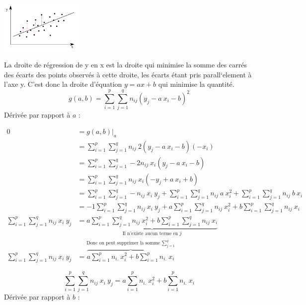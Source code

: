 \begin{center}
	\includegraphics[width=0.3\textwidth]{images/droite_de_regression.pdf}
\end{center}
La droite de régression de y en x est la droite qui minimise la somme des carrés des écarts des points observés à cette droite, les écarts étant pris parall`element à l'axe y. C'est donc la droite d'équation $y = ax+b$ qui minimise la quantité.
$$\boxed{g(a,b) = \sum_{i=1}^{p} \sum_{j=1}^{q} n_{ij} (y_j - a\ x_i - b)^2}$$
Dérivée par rapport à $a$ :
\begin{center}
	$\begin{array}{RL}
		0 &= \left.g(a,b)\right|_a\\
		  &= \sum_{i=1}^{p} \sum_{j=1}^{q} n_{ij}\ 2(y_j - a\ x_i-b)(-x_i)\\
		  &= \sum_{i=1}^{p} \sum_{j=1}^{q} -2n_{ij}\ x_i(y_j - a\ x_i - b)\\
		  &= \sum_{i=1}^{p} \sum_{j=1}^{q} n_{ij}\ x_i(-y_j + a\ x_i + b)\\
		  &= \sum_{i=1}^{p} \sum_{j=1}^{q} -n_{ij}\ x_i\ y_j + \sum_{i=1}^{p} \sum_{j=1}^{q} n_{ij}\ a\ x_i^2 + \sum_{i=1}^{p} \sum_{j=1}^{q} n_{ij}\ b\ x_i\\
		  &= -1 \sum_{i=1}^{p} \sum_{j=1}^{q} n_{ij}\ x_i\ y_j + a \sum_{i=1}^{p} \sum_{j=1}^{q} n_{ij}\ x_i^2 + b \sum_{i=1}^{p} \sum_{j=1}^{q} n_{ij}\ x_i\\
		  \sum_{i=1}^{p} \sum_{j=1}^{q} n_{ij}\ x_i\ y_j  &= \underbrace{a \sum_{i=1}^{p} \sum_{j=1}^{q} n_{ij}\ x_i^2 + b \sum_{i=1}^{p} \sum_{j=1}^{q} n_{ij}\ x_i}_\text{Il n'existe aucun terme en $j$}\\
		\sum_{i=1}^{p} \sum_{j=1}^{q} n_{ij}\ x_i\ y_j  &= \overbrace{a \sum_{i=1}^{p} n_{i.}\ x_i^2 + b \sum_{i=1}^{p} n_{i.}\ x_i}^\text{Donc on peut supprimer la somme $\sum_{j=1}^{q}$}
	\end{array}$
\end{center}
$$\boxed{\sum_{i=1}^{p} \sum_{j=1}^{q} n_{ij}\ x_i\ y_j = a \sum_{i=1}^{p} n_{i.}\ x_i^2 + b \sum_{i=1}^{p} n_{i.}\ x_i}$$
Dérivée par rapport à $b$ :
